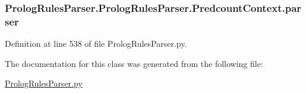 \subsubsection[{parser}]{\setlength{\rightskip}{0pt plus 5cm}Prolog\+Rules\+Parser.\+Prolog\+Rules\+Parser.\+Predcount\+Context.\+parser}\label{class_prolog_rules_parser_1_1_prolog_rules_parser_1_1_predcount_context_a265082cf0109e603962e8fe6d2b1904f}


Definition at line 538 of file Prolog\+Rules\+Parser.\+py.



The documentation for this class was generated from the following file\+:\begin{DoxyCompactItemize}
\item 
\hyperlink{_prolog_rules_parser_8py}{Prolog\+Rules\+Parser.\+py}\end{DoxyCompactItemize}
